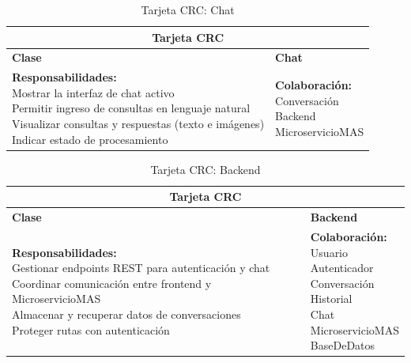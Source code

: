 \begin{addendum}
		\begin{longtable}{|l|l|}
			\caption{Tarjeta CRC: Chat} \label{tablacrc10} \\
			\hline
			\multicolumn{2}{|c|}{\textbf{Tarjeta CRC}} \\
			\hline
			\textbf{Clase} & \textbf{Chat} \\
			\hline
			\parbox[t]{0.45\linewidth}{\textbf{Responsabilidades:} \\ 
				Mostrar la interfaz de chat activo \\ 
				Permitir ingreso de consultas en lenguaje natural \\ 
				Visualizar consultas y respuestas (texto e imágenes) \\ 
				Indicar estado de procesamiento} 
			& 
			\parbox[t]{0.45\linewidth}{\textbf{Colaboración:} \\ 
				Conversación \\ 
				Backend \\ 
				MicroservicioMAS} \\
			\hline
		\end{longtable}
		
		\begin{longtable}{|l|l|}
			\caption{Tarjeta CRC: Backend} \label{tablacrc11} \\
			\hline
			\multicolumn{2}{|c|}{\textbf{Tarjeta CRC}} \\
			\hline
			\textbf{Clase} & \textbf{Backend} \\
			\hline
			\parbox[t]{0.45\linewidth}{\textbf{Responsabilidades:} \\ 
				Gestionar endpoints REST para autenticación y chat \\ 
				Coordinar comunicación entre frontend y MicroservicioMAS \\ 
				Almacenar y recuperar datos de conversaciones \\ 
				Proteger rutas con autenticación} 
			& 
			\parbox[t]{0.45\linewidth}{\textbf{Colaboración:} \\ 
				Usuario \\ 
				Autenticador \\ 
				Conversación \\ 
				Historial \\ 
				Chat \\ 
				MicroservicioMAS \\ 
				BaseDeDatos} \\
			\hline
		\end{longtable}
		

\end{addendum}
